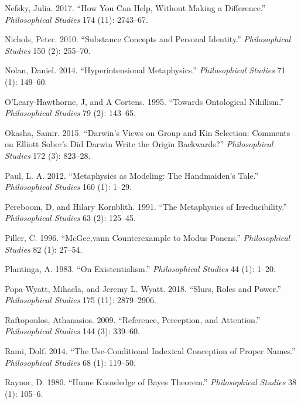 \documentclass[
  10pt,
  letterpaper,
  DIV=11,
  numbers=noendperiod,
  twoside]{scrartcl}
\newlength{\cslhangindent}
\newenvironment{CSLReferences}[2] %
 {\begin{list}{}{%
  \setlength{\itemindent}{0pt}
  \setlength{\leftmargin}{0pt}
  \setlength{\parsep}{0pt}
  \ifodd #1
   \setlength{\leftmargin}{\cslhangindent}
   \setlength{\itemindent}{-1\cslhangindent}
  \fi
  \setlength{\itemsep}{#2\baselineskip}}}
 {\end{list}}
\begin{document}
\begin{CSLReferences}{1}{0}
Nefsky, Julia. 2017. {``How You Can Help, Without Making a
Difference.''} \emph{Philosophical Studies} 174 (11): 2743--67.

Nichols, Peter. 2010. {``Substance Concepts and Personal Identity.''}
\emph{Philosophical Studies} 150 (2): 255--70.

Nolan, Daniel. 2014. {``Hyperintensional Metaphysics.''}
\emph{Philosophical Studies} 71 (1): 149--60.

O'Leary-Hawthorne, J, and A Cortens. 1995. {``Towards Ontological
Nihilism.''} \emph{Philosophical Studies} 79 (2): 143--65.

Okasha, Samir. 2015. {``Darwin's Views on Group and Kin Selection:
Comments on Elliott Sober's Did Darwin Write the Origin Backwards?''}
\emph{Philosophical Studies} 172 (3): 823--28.

Paul, L. A. 2012. {``Metaphysics as Modeling: The Handmaiden's Tale.''}
\emph{Philosophical Studies} 160 (1): 1--29.

Pereboom, D, and Hilary Kornblith. 1991. {``The Metaphysics of
Irreducibility.''} \emph{Philosophical Studies} 63 (2): 125--45.

Piller, C. 1996. {``McGee,vann Counterexample to Modus Ponens.''}
\emph{Philosophical Studies} 82 (1): 27--54.

Plantinga, A. 1983. {``On Existentialism.''} \emph{Philosophical
Studies} 44 (1): 1--20.

Popa-Wyatt, Mihaela, and Jeremy L. Wyatt. 2018. {``Slurs, Roles and
Power.''} \emph{Philosophical Studies} 175 (11): 2879--2906.

Raftopoulos, Athanasios. 2009. {``Reference, Perception, and
Attention.''} \emph{Philosophical Studies} 144 (3): 339--60.

Rami, Dolf. 2014. {``The Use-Conditional Indexical Conception of Proper
Names.''} \emph{Philosophical Studies} 68 (1): 119--50.

Raynor, D. 1980. {``Hume Knowledge of Bayes Theorem.''}
\emph{Philosophical Studies} 38 (1): 105--6.


\end{CSLReferences}
\end{document}
